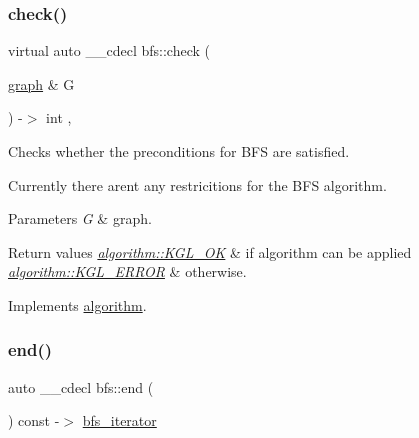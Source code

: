 \subsubsection{\texorpdfstring{check()}{check()}}
{\footnotesize\ttfamily virtual auto \+\_\+\+\_\+cdecl bfs\+::check (\begin{DoxyParamCaption}\item[{\mbox{\hyperlink{classgraph}{graph}} \&}]{G }\end{DoxyParamCaption}) -\/$>$ int \hspace{0.3cm}{\ttfamily [inline]}, {\ttfamily [virtual]}}



Checks whether the preconditions for B\+FS are satisfied. 

Currently there aren\textquotesingle{}t any restricitions for the B\+FS algorithm.


\begin{DoxyParams}{Parameters}
{\em G} & graph. \\
\hline
\end{DoxyParams}

\begin{DoxyRetVals}{Return values}
{\em \mbox{\hyperlink{classalgorithm_af1a0078e153aa99c24f9bdf0d97f6710aae4c1cd7fe8d8cf4b143241a6e7c31cf}{algorithm\+::\+K\+G\+L\+\_\+\+OK}}} & if algorithm can be applied \\
\hline
{\em \mbox{\hyperlink{classalgorithm_af1a0078e153aa99c24f9bdf0d97f6710ae67bf27b2ef31f73e545a7f9f4a69556}{algorithm\+::\+K\+G\+L\+\_\+\+E\+R\+R\+OR}}} & otherwise. \\
\hline
\end{DoxyRetVals}


Implements \mbox{\hyperlink{classalgorithm_a05c0f25463eb35a77b2d73fc06bb2c0e}{algorithm}}.

\mbox{\label{classbfs_a355a37450bce8f14548983d5c6097aea}} 
\subsubsection{\texorpdfstring{end()}{end()}}
{\footnotesize\ttfamily auto \+\_\+\+\_\+cdecl bfs\+::end (\begin{DoxyParamCaption}{ }\end{DoxyParamCaption}) const -\/$>$ \mbox{\hyperlink{classbfs_acafce54954100cc7bc9f80eb318a7bee}{bfs\+\_\+iterator}}
	\hspace{0.3cm}{\ttfamily [inline]}}



